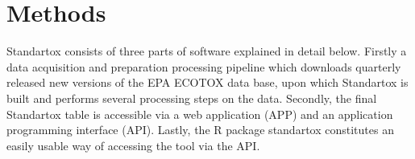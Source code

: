 \section*{Methods}

Standartox consists of three parts of software explained in detail below. Firstly a data acquisition and preparation processing pipeline which downloads quarterly released new versions of the EPA ECOTOX data base, upon which Standartox is built and performs several processing steps on the data. Secondly, the final Standartox table is accessible via a web application (APP) and an application programming interface (API). Lastly, the R \citep{rcoreteam_language_2017} package standartox constitutes an easily usable way of accessing the tool via the API.

